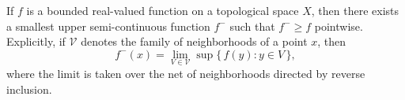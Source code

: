 If $f$ is a bounded real-valued function on a topological space $X$, then there exists a smallest upper semi-continuous function $f^{-}$ such that $f^{-} \geq f$ pointwise. Explicitly, if $\mathcal{V}$ denotes the family of neighborhoods of a point $x$, then
\[
f^{-}(x) = \lim_{V \in \mathcal{V}} \sup \{\, f(y) : y \in V \,\},
\]
where the limit is taken over the net of neighborhoods directed by reverse inclusion.
